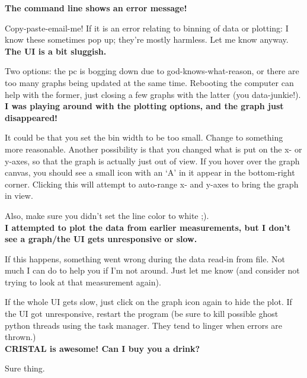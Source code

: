 \documentclass[10pt,a4paper]{article}
\begin{document}
\textbf{The command line shows an error message!}

Copy-paste-email-me! If it is an error relating to binning of data or plotting: I know these sometimes pop up; they're mostly harmless. Let me know anyway.\\

\textbf{The UI is a bit sluggish.}

Two options: the pc is bogging down due to god-knows-what-reason, or there are too many graphs being updated at the same time. Rebooting the computer can help with the former, just closing a few graphs with the latter (you data-junkie!).\\

\textbf{I was playing around with the plotting options, and the graph just disappeared!}

It could be that you set the bin width to be too small. Change to something more reasonable. Another possibility is that you changed what is put on the x- or y-axes, so that the graph is actually just out of view. If you hover over the graph canvas, you should see a small icon with an `A' in it appear in the bottom-right corner. Clicking this will attempt to auto-range x- and y-axes to bring the graph in view.

Also, make sure you didn't set the line color to white ;).\\


\textbf{I attempted to plot the data from earlier measurements, but I don't see a graph/the UI gets unresponsive or slow.}

If this happens, something went wrong during the data read-in from file. Not much I can do to help you if I'm not around. Just let me know (and consider not trying to look at that measurement again).

If the whole UI gets slow, just click on the graph icon again to hide the plot. If the UI got unresponsive, restart the program (be sure to kill possible ghost python threads using the task manager. They tend to linger when errors are thrown.)\\

\textbf{CRISTAL is awesome! Can I buy you a drink?}

Sure thing.\\
\end{document}
